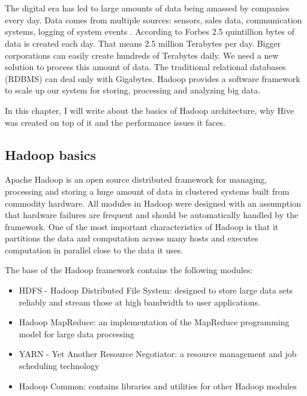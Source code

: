 \chapter{\bevezetes}


The digital era has led to large amounts of data being amassed by companies every day. Data comes from multiple sources: sensors, sales data, communication systems, logging of system events \etc. According to Forbes \cite{Forbes} 2.5 quintillion bytes of data is created each day. That means 2.5 million Terabytes per day. Bigger corporations can easily create hundreds of Terabytes daily. We need a new solution to process this amount of data. The traditional relational databases (RDBMS) can deal only with Gigabytes. Hadoop provides a software framework to scale up our system for storing, processing and analyzing big data.

In this chapter, I will write about the basics of Hadoop architecture, why Hive was created on top of it and the performance issues it faces.

\section{Hadoop basics}
Apache Hadoop is an open source distributed framework for managing, processing  and storing a huge amount of data in clustered systems built from commodity hardware. All modules in Hadoop were designed with an assumption that hardware failures are frequent and should be automatically handled by the framework. One of the most important characteristics of Hadoop is that it partitions the data and computation across many hosts and executes computation in parallel close to the data it uses.  \cite{Hadoop-wiki}

The base of the Hadoop framework contains the following modules:
\begin{itemize}
	\item HDFS - Hadoop Distributed File System: designed to store large data sets reliably and stream those at high bandwidth to user applications.
	\item Hadoop MapReduce: an implementation of the MapReduce programming model for large data processing
	\item YARN - Yet Another Resource Negotiator: a resource management and job scheduling technology
	\item Hadoop Common: contains libraries and utilities for other Hadoop modules
\end{itemize}
